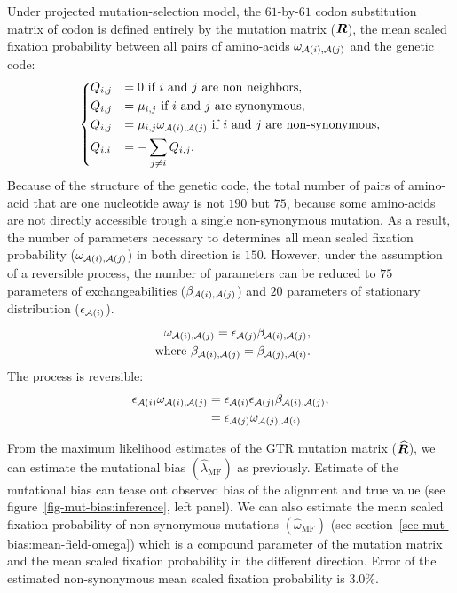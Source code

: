 Under projected mutation-selection model, the $61$-by-$61$ \gls{codon} \gls{substitution} matrix of \gls{codon} is defined entirely by the mutation matrix ($\bm{R}$), the mean scaled fixation probability between all pairs of amino-acids $\omega_{\mathcal{A}({i}), \mathcal{A}({j})}$ and the genetic code:
\begin{equation}
    \begin{dcases}
        Q_{{i}, {j}} & = 0 \text{ if ${i}$ and ${j}$ are non neighbors}, \\
        Q_{{i}, {j}} & = \mu_{{i}, {j}} \text{ if ${i}$ and ${j}$ are synonymous}, \\
        Q_{{i}, {j}} & = \mu_{{i}, {j}} \omega_{\mathcal{A}({i}), \mathcal{A}({j})} \text{ if ${i}$ and ${j}$ are non-synonymous}, \\
        Q_{{i}, {i}} & = - \sum\limits_{{j} \neq {i}} Q_{{i}, {j}}.
    \end{dcases}
    \label{eq:codon-mean-field}
\end{equation}
Because of the structure of the genetic code, the total number of pairs of amino-acid that are one nucleotide away is not $190$ but $75$, because some amino-acids are not directly accessible trough a single non-synonymous mutation.
As a result, the number of parameters necessary to determines all mean scaled fixation probability ($\omega_{\mathcal{A}({i}), \mathcal{A}({j})}$) in both direction is $150$.
However, under the assumption of a reversible process, the number of parameters can be reduced to $75$ parameters of exchangeabilities ($\beta_{\mathcal{A}({i}), \mathcal{A}({j})}$) and $20$ parameters of stationary distribution ($\epsilon_{\mathcal{A}({i})}$).
\begin{align}
    \omega_{\mathcal{A}({i}), \mathcal{A}({j})} = \epsilon_{\mathcal{A}({j})} \beta_{\mathcal{A}({i}), \mathcal{A}({j})}, \\
    \text{ where } \beta_{\mathcal{A}({i}), \mathcal{A}({j})} = \beta_{\mathcal{A}({j}), \mathcal{A}({i})}.
\end{align}
The process is reversible:
\begin{align}
    \epsilon_{\mathcal{A}({i})} \omega_{\mathcal{A}({i}), \mathcal{A}({j})} & = \epsilon_{\mathcal{A}({i})} \epsilon_{\mathcal{A}({j})} \beta_{\mathcal{A}({i}), \mathcal{A}({j})}, \\
    & = \epsilon_{\mathcal{A}({j})} \omega_{\mathcal{A}({j}), \mathcal{A}({i})}
\end{align}

From the maximum \gls{likelihood} estimates of the GTR mutation matrix ($\widehat{\bm{R}}$), we can estimate the mutational bias $\left({\widehat{\lambda}_{\text{MF}}} \right)$ as previously.
Estimate of the mutational bias can tease out observed bias of the alignment and true value (see figure~\ref{fig-mut-bias:inference}, left panel).
We can also estimate the mean scaled fixation probability of non-synonymous mutations $\left({\widehat{\omega}_{\text{MF}}} \right)$ (see section~\ref{sec-mut-bias:mean-field-omega}) which is a compound parameter of the mutation matrix and the mean scaled fixation probability in the different direction.
Error of the estimated non-synonymous mean scaled fixation probability is 3.0\%.

